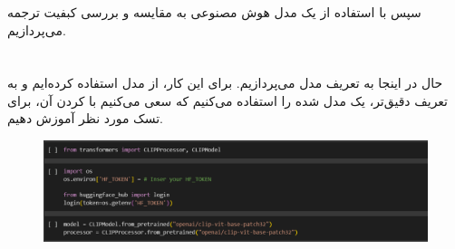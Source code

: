 \documentclass[12pt]{article}
\begin{document}
	\subsubsection{}
	سپس با استفاده از یک مدل هوش مصنوعی  به مقایسه و بررسی کبفیت ترجمه می‌پردازیم.
	\begin{figure}[H]
		\centering
		\quad \quad
	\end{figure}
	\section{}
	حال در اینجا به تعریف مدل می‌پردازیم. برای این کار، از مدل  استفاده کرده‌ایم و به تعریف دقیق‌تر، یک مدل  شده را استفاده می‌کنیم که سعی می‌کنیم با  کردن آن، برای تسک مورد نظر آموزش دهیم.
	\begin{figure}[H]
		\centering
		\includegraphics[width=0.9\linewidth]{pic_8}
	\end{figure}
\end{document}
